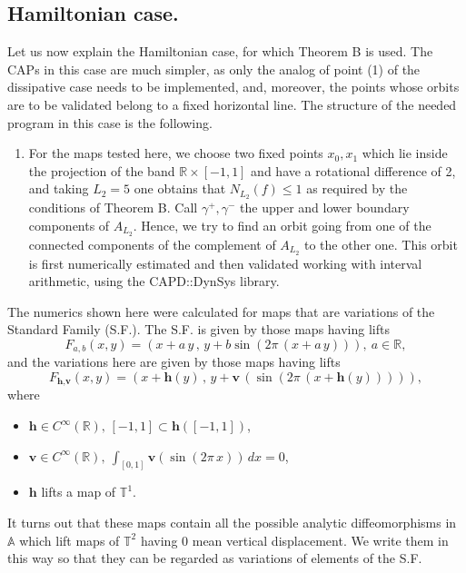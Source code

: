 \documentclass[12pt,a4paper]{amsart}
\theoremstyle{definition}
\theoremstyle{remark}
\newcommand{\T}{\mathbb{T}}
\newcommand{\R}{\mathbb{R}}
\newcommand{\A}{\mathbb{A}}
\begin{document}
 
 \subsection{Hamiltonian case.}

Let us now explain the Hamiltonian case, for which Theorem B is used. The CAPs
in this case are much simpler, as only the analog of point (1) of the dissipative case needs to be implemented, 
and, moreover, the points whose orbits are to be validated belong to a fixed horizontal line.
The structure of the needed program in this case is the following.

\begin{enumerate}

\item For the maps tested here, we choose two fixed points $x_0,x_1$ which lie inside
the projection of the band $\R\times[-1,1]$ and have a rotational difference of 2, and taking $L_2=5$ one obtains that $N_{L_2}(f)\leq 1$ as required by the conditions of Theorem B.  Call $\gamma^+,\gamma^-$ the upper and lower
boundary components of $A_{L_2}$.
Hence, we try to find an orbit going from one of the connected components of the complement of $A_{L_2}$ to the other one. This orbit is first numerically estimated and then validated working with interval arithmetic, using
the CAPD::DynSys library. 


\end{enumerate}

The numerics shown here were calculated for maps that are variations of the Standard Family (S.F.). The S.F.
is given by those maps having lifts
$$F_{a,b}(x,y)=(x+a\,y\,,\,y+b\sin(2\pi\,(x+a\,y))),\ a\in\R,$$ 
and the variations here are given by those maps having lifts 
$$F_{\textbf{h},\textbf{v}}(x,y)=(x+\textbf{h}(y)\,,\,y+\textbf{v}\,(\sin(2\pi\,(x+\textbf{h}(y))))),$$
where
\begin{itemize}
\item $\textbf{h}\in C^{\infty}(\R),\, [-1,1]\subset \textbf{h}([-1,1])$,
\item $\textbf{v}\in C^{\infty}(\R),\ \int_{[0,1]}\textbf{v}(\sin(2\pi\,x))\,dx=0$,
\item $\textbf{h}$ lifts a map of $\T^1$.
\end{itemize}
It turns out that these maps contain all the possible analytic diffeomorphisms in $\A$ which lift
maps of $\T^2$ having 0 mean
vertical displacement. We write them in this way
so that they can be regarded as variations of elements of the S.F.
\end{document}
